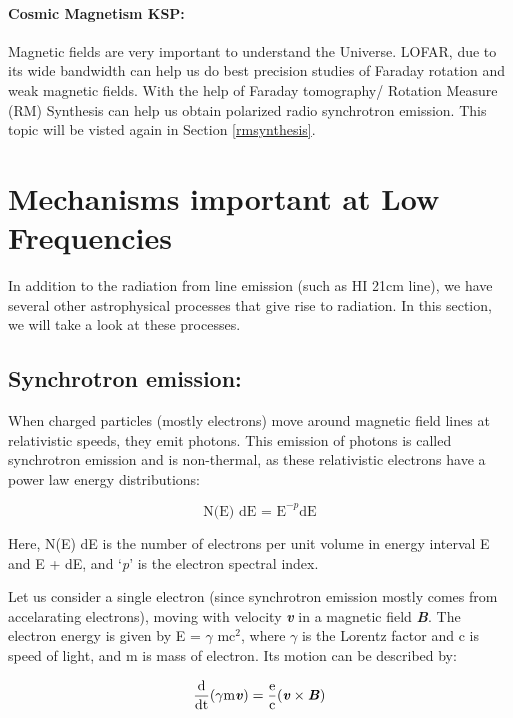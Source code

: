 \documentclass[../main/thesis_msc.tex]{subfiles}
\begin{document}
\paragraph{Cosmic Magnetism KSP:} Magnetic fields are very important to understand the Universe. LOFAR, due to its wide bandwidth can help us do best precision studies of Faraday rotation and weak magnetic fields. With the help of Faraday tomography/ Rotation Measure (RM) Synthesis can help us obtain polarized radio synchrotron emission. This topic will be visted again in Section \ref{rmsynthesis}.

\section{Mechanisms important at Low Frequencies}
In addition to the radiation from line emission (such as HI 21cm line), we have several other astrophysical processes that give rise to radiation. In this section, we will take a look at these processes.

\subsection{Synchrotron emission:}
\label{sec:sync}
When charged particles (mostly electrons) move around magnetic field lines at relativistic speeds, they emit photons. This emission of photons is called synchrotron emission and is non-thermal, as these relativistic electrons have a power law energy distributions:

\begin{equation}
\textrm{N(E) dE = E}^{-p} \textrm{dE}
\end{equation}

\noindent Here, N(E) dE is the number of electrons per unit volume in energy interval E and E + dE, and `\textit{p}' is the electron spectral index.

\noindent Let us consider a single electron (since synchrotron emission mostly comes from accelarating electrons), moving with velocity {\textbf{\textit{v}}} in a magnetic field {\textbf{\textit{B}}}. The electron energy is given by E = $\gamma$ mc$^2$, where $\gamma$ is the Lorentz factor and c is speed of light, and m is mass of electron. Its motion can be described by:

\begin{equation}
\frac{\textrm{d}}{\textrm{dt}} (\gamma \textrm{m}  {\textbf{\textit{v}}} ) = \frac{\textrm{e}}{\textrm{c}} (  {\textbf{\textit{v}}} \times  {\textbf{\textit{B}}} )
\end{equation}
\end{document}
